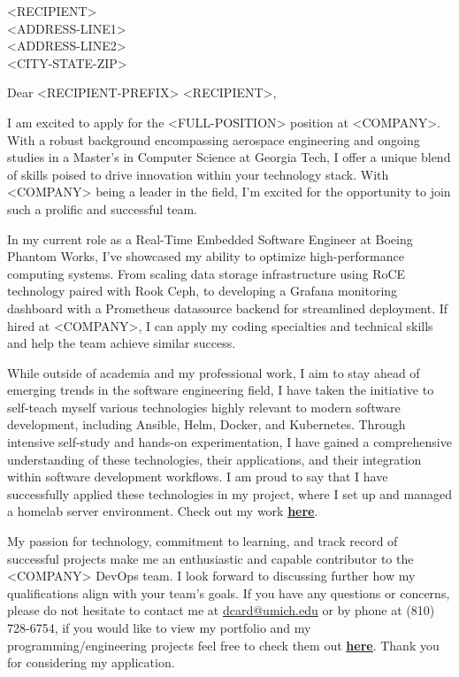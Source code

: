 \large
\bigskip\begin{minipage}[h]{\linewidth}
    \begin{raggedright}
        <RECIPIENT>\\
        <ADDRESS-LINE1>\\
        <ADDRESS-LINE2>\\
        <CITY-STATE-ZIP>\\
    \end{raggedright}
\end{minipage}

\bigskip Dear <RECIPIENT-PREFIX> <RECIPIENT>,

\medskip I am excited to apply for the <FULL-POSITION> position at <COMPANY>. With a robust background encompassing aerospace engineering and ongoing studies in a Master's in Computer Science at Georgia Tech, I offer a unique blend of skills poised to drive innovation within your technology stack. With <COMPANY> being a leader in the field, I'm excited for the opportunity to join such a prolific and successful team.

\medskip In my current role as a Real-Time Embedded Software Engineer at Boeing Phantom Works, I've showcased my ability to optimize high-performance computing systems. From scaling data storage infrastructure using RoCE technology paired with Rook Ceph, to developing a Grafana monitoring dashboard with a Prometheus datasource backend for streamlined deployment. If hired at <COMPANY>, I can apply my coding specialties and technical skills and help the team achieve similar success.

\medskip While outside of academia and my professional work, I aim to stay ahead of emerging trends in the software engineering field, I have taken the initiative to self-teach myself various technologies highly relevant to modern software development, including Ansible, Helm, Docker, and Kubernetes. Through intensive self-study and hands-on experimentation, I have gained a comprehensive understanding of these technologies, their applications, and their integration within software development workflows. I am proud to say that I have successfully applied these technologies in my project, where I set up and managed a homelab server environment. Check out my work \href{https://github.com/dancard32/homelab}{\textbf{\underline{here}}}.

\medskip My passion for technology, commitment to learning, and track record of successful projects make me an enthusiastic and capable contributor to the <COMPANY> DevOps team. I look forward to discussing further how my qualifications align with your team's goals. If you have any questions or concerns, please do not hesitate to contact me at \href{mailto:dcard@umich.edu}{dcard@umich.edu} or by phone at (810) 728-6754, if you would like to view my portfolio and my programming/engineering projects feel free to check them out \href{https://dancard32.github.io/website/#/projects}{\textbf{\underline{here}}}. Thank you for considering my application.


